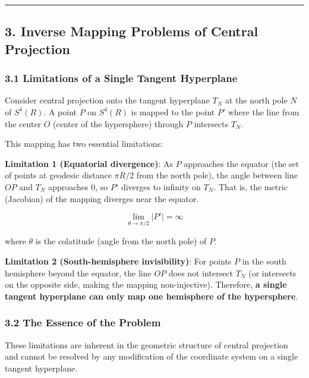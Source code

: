\documentclass[a4paper,11pt]{article}
\begin{document}
\begin{center}\rule{0.5\linewidth}{0.5pt}\end{center}

\subsection{3. Inverse Mapping Problems of Central
Projection}\label{inverse-mapping-problems-of-central-projection}

\subsubsection{3.1 Limitations of a Single Tangent
Hyperplane}\label{limitations-of-a-single-tangent-hyperplane}

Consider central projection onto the tangent hyperplane \(T_N\) at the
north pole \(N\) of \(S^4(R)\). A point \(P\) on \(S^4(R)\) is mapped to
the point \(P'\) where the line from the center \(O\) (center of the
hypersphere) through \(P\) intersects \(T_N\).

This mapping has two essential limitations:

\textbf{Limitation 1 (Equatorial divergence)}: As \(P\) approaches the
equator (the set of points at geodesic distance \(\pi R / 2\) from the
north pole), the angle between line \(OP\) and \(T_N\) approaches 0, so
\(P'\) diverges to infinity on \(T_N\). That is, the metric (Jacobian)
of the mapping diverges near the equator.

\[\lim_{\theta \to \pi/2} |P'| = \infty\]

where \(\theta\) is the colatitude (angle from the north pole) of \(P\).

\textbf{Limitation 2 (South-hemisphere invisibility)}: For points \(P\)
in the south hemisphere beyond the equator, the line \(OP\) does not
intersect \(T_N\) (or intersects on the opposite side, making the
mapping non-injective). Therefore, \textbf{a single tangent hyperplane
can only map one hemisphere of the hypersphere}.

\subsubsection{3.2 The Essence of the
Problem}\label{the-essence-of-the-problem}

These limitations are inherent in the geometric structure of central
projection and cannot be resolved by any modification of the coordinate
system on a single tangent hyperplane.
\end{document}
